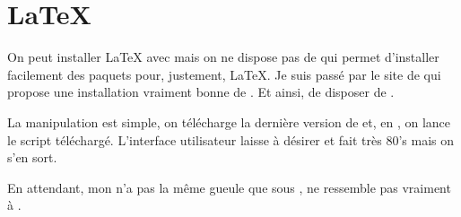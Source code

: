 \section{\LaTeX}
On peut installer \LaTeX{} avec  mais on ne dispose pas de  qui permet d'installer facilement des paquets pour, justement, \LaTeX{}. Je suis passé par le site de  qui propose une installation vraiment bonne de . Et ainsi, de disposer de .

La manipulation est simple, on télécharge la dernière version de  et, en , on lance le script téléchargé. L'interface utilisateur laisse à désirer et fait très 80's mais on s'en sort.

En attendant, mon  n'a pas la même gueule que sous ,  ne ressemble pas vraiment à .
